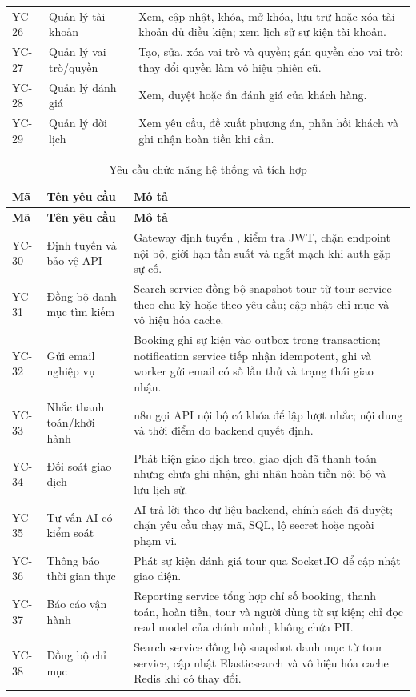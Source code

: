 \begin{longtable}{@{}C{1.35cm}L{4.0cm}L{9.5cm}@{}}
YC-26 & Quản lý tài khoản & Xem, cập nhật, khóa, mở khóa, lưu trữ hoặc xóa tài khoản đủ điều kiện; xem lịch sử sự kiện tài khoản.\\
YC-27 & Quản lý vai trò/quyền & Tạo, sửa, xóa vai trò và quyền; gán quyền cho vai trò; thay đổi quyền làm vô hiệu phiên cũ.\\
YC-28 & Quản lý đánh giá & Xem, duyệt hoặc ẩn đánh giá của khách hàng.\\
YC-29 & Quản lý dời lịch & Xem yêu cầu, đề xuất phương án, phản hồi khách và ghi nhận hoàn tiền khi cần.\\
\end{longtable}

\begin{longtable}{@{}C{1.35cm}L{4.0cm}L{9.5cm}@{}}
\caption{Yêu cầu chức năng hệ thống và tích hợp}
\label{tab:yc-he-thong}\\
\toprule
\textbf{Mã} & \textbf{Tên yêu cầu} & \textbf{Mô tả}\\
\midrule
\endfirsthead
\toprule
\textbf{Mã} & \textbf{Tên yêu cầu} & \textbf{Mô tả}\\
\midrule
\endhead
\bottomrule
\endfoot
YC-30 & Định tuyến và bảo vệ API & Gateway định tuyến , kiểm tra JWT, chặn endpoint nội bộ, giới hạn tần suất và ngắt mạch khi auth gặp sự cố.\\
YC-31 & Đồng bộ danh mục tìm kiếm & Search service đồng bộ snapshot tour từ tour service theo chu kỳ hoặc theo yêu cầu; cập nhật chỉ mục và vô hiệu hóa cache.\\
YC-32 & Gửi email nghiệp vụ & Booking ghi sự kiện vào outbox trong transaction; notification service tiếp nhận idempotent, ghi  và worker gửi email có số lần thử và trạng thái giao nhận.\\
YC-33 & Nhắc thanh toán/khởi hành & n8n gọi API nội bộ có khóa để lập lượt nhắc; nội dung và thời điểm do backend quyết định.\\
YC-34 & Đối soát giao dịch & Phát hiện giao dịch treo, giao dịch đã thanh toán nhưng chưa ghi nhận, ghi nhận hoàn tiền nội bộ và lưu lịch sử.\\
YC-35 & Tư vấn AI có kiểm soát & AI trả lời theo dữ liệu backend, chính sách đã duyệt; chặn yêu cầu chạy mã, SQL, lộ secret hoặc ngoài phạm vi.\\
YC-36 & Thông báo thời gian thực & Phát sự kiện đánh giá tour qua Socket.IO để cập nhật giao diện.\\
YC-37 & Báo cáo vận hành & Reporting service tổng hợp chỉ số booking, thanh toán, hoàn tiền, tour và người dùng từ sự kiện; chỉ đọc read model  của chính mình, không chứa PII.\\
YC-38 & Đồng bộ chỉ mục & Search service đồng bộ snapshot danh mục từ tour service, cập nhật Elasticsearch và vô hiệu hóa cache Redis khi có thay đổi.\\
\end{longtable}


